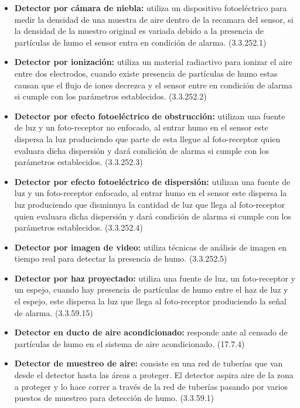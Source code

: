 \begin{itemize}
	
	\item \textbf{Detector por cámara de niebla:} utiliza un dispositivo fotoeléctrico para medir la densidad de una muestra de aire dentro de la recamara del sensor, si la densidad de la muestro original es variada debido a la presencia de partículas de humo el sensor entra en condición de alarma. (3.3.252.1)
	
	
	\item \textbf{Detector por ionización:} utiliza un material radiactivo para ionizar el aire entre dos electrodos, cuando existe presencia de partículas de humo estas causan que el flujo de iones decrezca y el sensor entre en condición de alarma si cumple con los parámetros establecidos. (3.3.252.2)
	
	
	\item \textbf{Detector por efecto fotoeléctrico de obstrucción:} utilizan una fuente de luz y un foto-receptor no enfocado, al entrar humo en el sensor este dispersa la luz produciendo que parte de esta llegue al foto-receptor quien evaluara dicha dispersión y dará condición de alarma si cumple con los parámetros establecidos. (3.3.252.3)
	
	\item \textbf{Detector por efecto fotoeléctrico de dispersión:} utilizan una fuente de luz y un foto-receptor enfocado, al entrar humo en el sensor este dispersa la luz produciendo que disminuya la cantidad de luz que llega al foto-receptor quien evaluara dicha dispersión y dará condición de alarma si cumple con los parámetros establecidos. (3.3.252.4)

	\item \textbf{Detector por imagen de video:} utiliza técnicas de análisis de imagen en tiempo real para detectar la presencia de humo. (3.3.252.5)
	
	\item \textbf{Detector por haz proyectado:} utiliza una fuente de luz, un foto-receptor y un espejo, cuando hay presencia de partículas de humo entre el haz de luz y el espejo, este dispersa la luz que llega al foto-receptor produciendo la señal de alarma. (3.3.59.15)

	\item \textbf{Detector en ducto de aire acondicionado:} responde ante al censado de partículas de humo en el sistema de aire acondicionado. (17.7.4)	
	
	\newpage
	
	\item \textbf{Detector de muestreo de aire:} consiste en una red de tuberías que van desde el detector hasta las áreas a proteger. El detector aspira aire de la zona a proteger y lo hace correr a través de la red de tuberías pasando por varios puestos de muestreo para detección de humo. (3.3.59.1)
		

\end{itemize}


